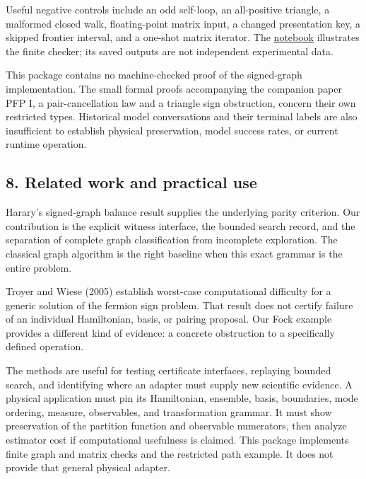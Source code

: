 \documentclass[
  11pt,
]{article}
\begin{document}
Useful negative controls include an odd self-loop, an all-positive
triangle, a malformed closed walk, floating-point matrix input, a
changed presentation key, a skipped frontier interval, and a one-shot
matrix iterator. The
\href{https://github.com/dbccpage/the_symbol_game/blob/main/education/documentation/030_pfp_proposal_fidelity_protocol_pfp/papers/symbol_game/002_pfp_signed_presentations_and_search_frontier/jupyter_notebooks/signed_exchange_and_frontier.ipynb}{notebook}
illustrates the finite checker; its saved outputs are not independent
experimental data.

This package contains no machine-checked proof of the signed-graph
implementation. The small formal proofs accompanying the companion paper
PFP I, a pair-cancellation law and a triangle sign obstruction, concern
their own restricted types. Historical model conversations and their
terminal labels are also insufficient to establish physical
preservation, model success rates, or current runtime operation.

\hypertarget{related-work-and-practical-use}{%
\subsection{8. Related work and practical
use}\label{related-work-and-practical-use}}

Harary's signed-graph balance result supplies the underlying parity
criterion. Our contribution is the explicit witness interface, the
bounded search record, and the separation of complete graph
classification from incomplete exploration. The classical graph
algorithm is the right baseline when this exact grammar is the entire
problem.

Troyer and Wiese (2005) establish worst-case computational difficulty
for a generic solution of the fermion sign problem. That result does not
certify failure of an individual Hamiltonian, basis, or pairing
proposal. Our Fock example provides a different kind of evidence: a
concrete obstruction to a specifically defined operation.

The methods are useful for testing certificate interfaces, replaying
bounded search, and identifying where an adapter must supply new
scientific evidence. A physical application must pin its Hamiltonian,
ensemble, basis, boundaries, mode ordering, measure, observables, and
transformation grammar. It must show preservation of the partition
function and observable numerators, then analyze estimator cost if
computational usefulness is claimed. This package implements finite
graph and matrix checks and the restricted path example. It does not
provide that general physical adapter.
\end{document}
